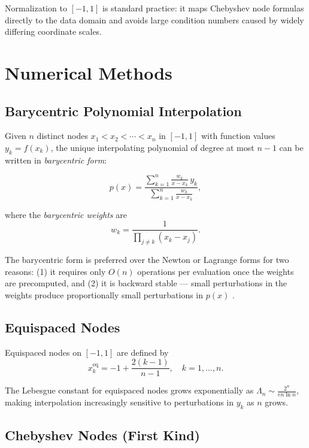 \documentclass[11pt]{article}
\begin{document}
Normalization to $[-1,1]$ is standard practice: it maps Chebyshev node
formulas directly to the data domain and avoids large condition numbers caused
by widely differing coordinate scales.

\section{Numerical Methods}

\subsection{Barycentric Polynomial Interpolation}

Given $n$ distinct nodes $x_1 < x_2 < \cdots < x_n$ in $[-1,1]$ with
function values $y_k = f(x_k)$, the unique interpolating polynomial of degree
at most $n-1$ can be written in \emph{barycentric form}:

\begin{equation}
  p(x) = \frac{\displaystyle\sum_{k=1}^{n} \frac{w_k}{x - x_k}\,y_k}
              {\displaystyle\sum_{k=1}^{n} \frac{w_k}{x - x_k}},
  \label{eq:bary}
\end{equation}

where the \emph{barycentric weights} are
\[
  w_k = \frac{1}{\prod_{j \neq k}(x_k - x_j)}.
\]

The barycentric form is preferred over the Newton or Lagrange forms for two
reasons: (1) it requires only $O(n)$ operations per evaluation once the
weights are precomputed, and (2) it is backward stable --- small perturbations
in the weights produce proportionally small perturbations in $p(x)$
\cite{higham2004}.

\subsection{Equispaced Nodes}

Equispaced nodes on $[-1,1]$ are defined by
\[
  x_k^{\mathrm{eq}} = -1 + \frac{2(k-1)}{n-1}, \quad k = 1, \ldots, n.
\]

The Lebesgue constant for equispaced nodes grows exponentially as
$\Lambda_n \sim \frac{2^n}{en\ln n}$, making interpolation increasingly
sensitive to perturbations in $y_k$ as $n$ grows.

\subsection{Chebyshev Nodes (First Kind)}
\end{document}
